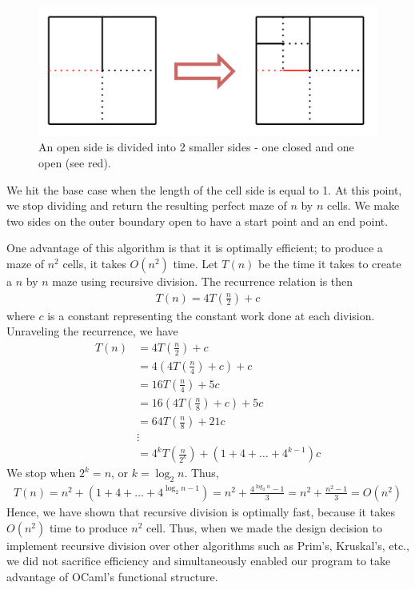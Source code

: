 \documentclass[11pt, margin=1in]{article}
\newcommand{\tab}{\par \qquad}
\begin{document}
\begin{figure}[H]
\begin{center}
\includegraphics[scale=0.7]{gen2.jpg}
\end{center}
\caption{An open side is divided into 2 smaller sides - one closed and one open (see red).}
\end{figure}

We hit the base case when the length of the cell side is equal to 1.  At this point, we stop dividing and return the resulting perfect maze of $n$ by $n$ cells.  We make two sides on the outer boundary open to have a start point and an end point.    

\tab One advantage of this algorithm is that it is optimally efficient; to produce a maze of $n^2$ cells, it takes $O(n^2)$ time.  Let $T(n)$ be the time it takes to create a $n$ by $n$ maze using recursive division.  The recurrence relation is then
\begin{align*}
T(n) = 4T\left(\frac{n}{2}\right) + c
\end{align*}  
where $c$ is a constant representing the constant work done at each division.  Unraveling the recurrence, we have
\begin{align*}
T(n) &= 4T\left(\frac{n}{2}\right) + c \\
&= 4\left(4T\left(\frac{n}{4}\right) + c\right) + c \\ 
&= 16 T\left(\frac{n}{4}\right) + 5c \\
&= 16 \left(4T\left(\frac{n}{8}\right) + c\right) + 5c \\ 
&= 64 T\left(\frac{n}{8}\right) + 21c \\
& \vdots \\
& = 4^k T\left(\frac{n}{2^k}\right) + (1 + 4 + \ldots + 4^{k-1})c
\end{align*}
We stop when $2^k = n$, or $k = \log_2n$.  Thus, 
\begin{align*}
T(n) = n^2 + (1 + 4 + \ldots + 4^{\log_2n-1}) = n^2 + \frac{4^{\log_2n} - 1}{3} = n^2 + \frac{n^2 - 1}{3} = O(n^2)
\end{align*}
Hence, we have shown that recursive division is optimally fast, because it takes $O(n^2)$ time to produce $n^2$ cell.  Thus, when we made the design decision to implement recursive division over other algorithms such as Prim's, Kruskal's, etc., we did not sacrifice efficiency and simultaneously enabled our program to take advantage of OCaml's functional structure.
\end{document}
